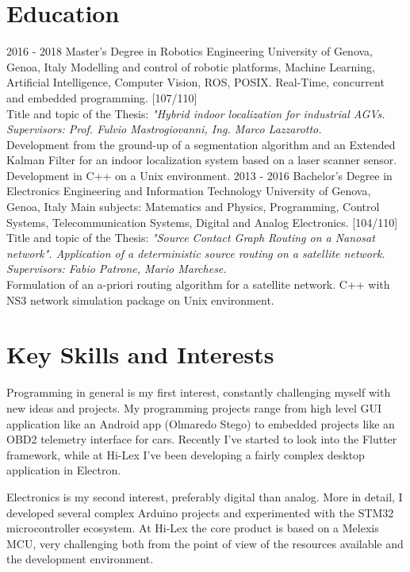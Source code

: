 \documentclass[]{friggeri-cv}
\begin{document}
\section{Education}
\begin{entrylist}
  \entry
    {2016 - 2018}
    {Master's Degree in Robotics Engineering}
    {University of Genova, Genoa, Italy}
    {Modelling and control of robotic platforms, Machine Learning, Artificial Intelligence, Computer Vision, ROS, POSIX. Real-Time, concurrent and embedded programming. [107/110]\\ Title and topic of the Thesis: 
    \emph{"Hybrid indoor localization for industrial AGVs. Supervisors: Prof. Fulvio Mastrogiovanni, Ing. Marco Lazzarotto.}\\ Development from the ground-up of a segmentation algorithm and an Extended Kalman Filter for an indoor localization system based on a laser scanner sensor. Development in C++ on a Unix environment.}
  \entry
    {2013 - 2016}
    {Bachelor's Degree in Electronics Engineering and Information Technology}
    {University of Genova, Genoa, Italy}
    {Main subjects: Matematics and Physics, Programming, Control Systems, Telecommunication Systems, Digital and Analog Electronics. [104/110]\\ Title and topic of the Thesis: 
    \emph{"Source Contact Graph Routing on a Nanosat network".
    Application of a deterministic source routing on a satellite network. Supervisors: Fabio Patrone, Mario Marchese.}\\ Formulation of an a-priori routing algorithm for a satellite network. C++ with NS3 network simulation package on Unix environment. }
\end{entrylist}

\clearpage
\section{Key Skills and Interests}
	Programming in general is my first interest, constantly challenging myself with new ideas and projects. My programming projects range from high level GUI application like an Android app (Olmaredo Stego) to embedded projects like an OBD2 telemetry interface for cars. Recently I've started to look into the Flutter framework, while at Hi-Lex I've been developing a fairly complex desktop application in Electron.
	
	Electronics is my second interest, preferably digital than analog. More in detail, I developed several complex Arduino projects and experimented with the STM32 microcontroller ecosystem. At Hi-Lex the core product is based on a Melexis MCU, very challenging both from the point of view of the resources available and the development environment.
	
\end{document}
